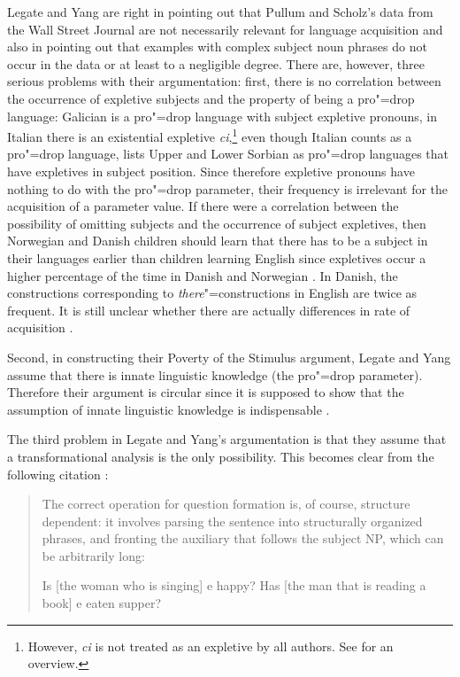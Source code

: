 Legate and Yang are right in pointing out that Pullum and Scholz's data from the Wall Street Journal are not necessarily relevant for language acquisition and also in pointing
out that examples with complex subject noun phrases do not occur in the data or at least to a
negligible degree. There are, however, three serious problems with their argumentation: first, there
is no correlation between the occurrence of expletive subjects and the property of being a pro"=drop
language: Galician \citep[Section~2.5]{RU90a-u} is a pro"=drop language with subject
expletive pronouns, in Italian there is an existential expletive \emph{ci},\footnote{%
	However, \emph{ci} is not treated as an expletive by all authors. See  for an overview.
} even though Italian counts as a pro"=drop language, \citet{Franks95a-u} lists Upper and Lower Sorbian as pro"=drop languages
 that have expletives in subject position.
Since therefore expletive pronouns have nothing to do with the pro"=drop parameter, their frequency is irrelevant for the acquisition of a parameter value. If there were a correlation
between the possibility of omitting subjects and the occurrence of subject expletives, then Norwegian and Danish children should learn that there has to be a subject
in their languages earlier than children learning English since expletives occur a higher percentage of the time in Danish and Norwegian \citep[]{SP2002b}.
In Danish, the constructions corresponding to \emph{there}"=constructions in English are twice as frequent. It is still unclear whether there are actually differences in
rate of acquisition \citep[]{Pullum2009a}.

\largerpage
\enlargethispage{2pt}
Second, in constructing their Poverty of the Stimulus argument, Legate and Yang assume that there is innate linguistic knowledge (the pro"=drop parameter).
Therefore their argument is circular since it is supposed to show that the assumption of innate linguistic knowledge is indispensable \citep[]{SP2002b}. 

The third problem in Legate and Yang's argumentation is that they assume that a transformational analysis is the only possibility. This becomes clear
from the following citation \citep[]{LY2002a}:
\begin{quote}
The correct operation for question formation is, of course, structure dependent: it involves parsing
the sentence into structurally organized phrases, and fronting the auxiliary that follows the
subject NP, which can be arbitrarily long:
\begin{exe}
\begin{xlist}
\ex Is [the woman who is singing] e happy?
\ex Has [the man that is reading a book] e eaten supper?
\end{xlist}
\end{exe}
\end{quote}

